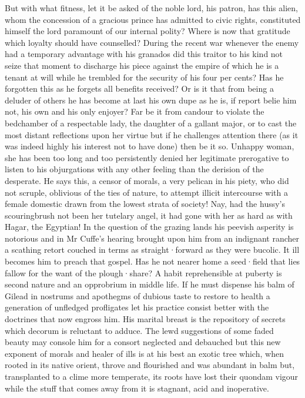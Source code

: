 But with what fitness,
let it be asked of the noble lord,
his patron,
has
this alien,
whom the concession of a gracious prince has admitted to
civic rights,
constituted himself the lord paramount of our internal
polity?
Where is now that gratitude which loyalty should have counselled?
During the recent war whenever the enemy had a temporary advantage with
his granados did this traitor to his kind
not seize that moment to discharge his piece against the empire of which he is a tenant at will
while he trembled for the security of his four per cents?
Has he forgotten this as he forgets all benefits received?
Or is it that from being a deluder of others he has become at last his own dupe as he is,
if report belie him not,
his own and his only enjoyer?
Far be it from
candour to violate the bedchamber of a respectable lady,
the daughter of
a gallant major,
or to cast the most distant reflections upon her virtue
but if he challenges attention there
(as it was indeed highly his
interest not to have done)
then be it so.
Unhappy woman,
she has been too
long and too persistently denied her legitimate prerogative to listen to
his objurgations with any other feeling
than the derision of the desperate.
He says this,
a censor of morals,
a very pelican in his piety,
who did not scruple,
oblivious of the ties of nature,
to attempt illicit
intercourse with a female domestic drawn from the lowest strata of
society!
Nay,
had the hussy's scouringbrush not been her tutelary angel,
it had gone with her as hard as with Hagar,
the Egyptian!
In the question
of the grazing lands his peevish asperity is notorious and in Mr Cuffe's
hearing brought upon him from an indignant rancher a scathing retort
couched in terms as straight·forward as they were bucolic.
It ill becomes him to preach that gospel.
Has he not nearer home a seed·field that lies
fallow for the want of the plough·share?
A habit reprehensible at puberty
is second nature and an opprobrium in middle life.
If he must dispense his balm of Gilead in nostrums and apothegms of dubious taste to restore
to health a generation of unfledged profligates let his practice consist
better with the doctrines that now engross him.
His marital breast is the
repository of secrets which decorum is reluctant to adduce.
The lewd
suggestions of some faded beauty may console him for a consort neglected
and debauched but this new exponent of morals and healer of ills is at
his best an exotic tree which,
when rooted in its native orient,
throve
and flourished and was abundant in balm but,
transplanted to a clime more
temperate,
its roots have lost their quondam vigour
while the stuff that comes away from it is stagnant,
acid and inoperative.

